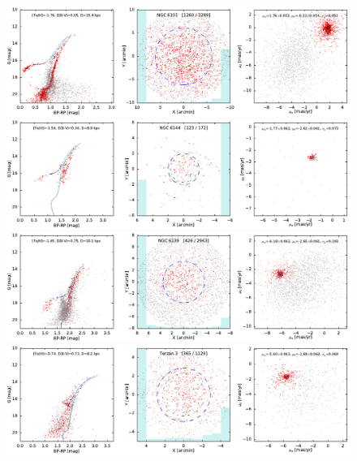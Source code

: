 \documentclass[usenatbib]{mnras}
\begin{document}
\clearpage\begin{figure}
\contcaption{}
\includegraphics{figs/NGC_6101.pdf}
\includegraphics{figs/NGC_6144.pdf}
\includegraphics{figs/NGC_6139.pdf}
\includegraphics{figs/Terzan_3.pdf}
\end{figure}
\end{document}
